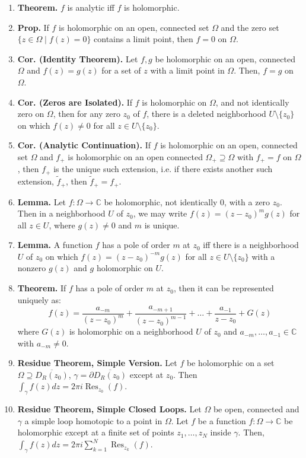 \documentclass[12pt]{article}
\theoremstyle{definition}
\theoremstyle{named}
\DeclareMathOperator{\Res}{Res}
\begin{document}
{\begin{multicols}{2}
\begin{spacing}{1.01}
\begin{enumerate}
    \item \textbf{Theorem. } $f$ is analytic iff $f$ is holomorphic. 
    \item \textbf{Prop. } If $f$ is holomorphic on an open, connected set $\Omega$ and the zero set $\{z \in \Omega \mid f(z) = 0\}$ contains a limit point, then $f=0$ on $\Omega$. 
    \item \textbf{Cor. (Identity Theorem). } Let $f,g$ be holomorphic on an open, connected $\Omega$ and $f(z)=g(z)$ for a set of $z$ with a limit point in $\Omega$. Then, $f=g$ on $\Omega$. 
    \item \textbf{Cor. (Zeros are Isolated). } If $f$ is holomorphic on $\Omega$, and not identically zero on $\Omega$, then for any zero $z_0$ of $f$, there is a deleted neighborhood $U \setminus \{z_0\}$ on which $f(z) \neq 0$ for all $z \in U \setminus \{z_0\}$. 
    \item \textbf{Cor. (Analytic Continuation). } If $f$ is holomorphic on an open, connected set $\Omega$ and $f_+$ is holomorphic on an open connected $\Omega_+ \supseteq \Omega$ with $f_+ = f$ on $\Omega$, then $f_+$ is the unique such extension, i.e. if there exists another such extension, $\tilde{f}_+$, then $\tilde{f}_+ = f_+$. 
    \item \textbf{Lemma. } Let $f: \Omega \to \mathbb{C}$ be holomorphic, not identically 0, with a zero $z_0$. Then in a neighborhood $U$ of $z_0$, we may write $f(z) = (z-z_0)^mg(z)$ for all $z \in U$, where $g(z) \neq 0$ and $m$ is unique. 
    \item \textbf{Lemma. } A function $f$ has a pole of order $m$ at $z_0$ iff there is a neighborhood $U$ of $z_0$ on which $f(z) = (z-z_0)^{-m}g(z)$ for all $z \in U \setminus \{z_0\}$ with a nonzero $g(z)$ and $g$ holomorphic on $U$. 
    \item \textbf{Theorem. } If $f$ has a pole of order $m$ at $z_0$, then it can be represented uniquely as: 
    $$
    f(z) = \frac{a_{-m}}{(z-z_0)^m} + \frac{a_{-m+1}}{(z-z_0)^{m-1}} + \dots + \frac{a_{-1}}{z-z_0} + G(z)
    $$ where $G(z)$ is holomorphic on a neighborhood $U$ of $z_0$ and $a_{-m}, \dots, a_{-1} \in \mathbb{C}$ with $a_{-m} \neq 0$. 
    \item \textbf{Residue Theorem, Simple Version. } Let $f$ be holomorphic on a set $\Omega \supseteq \overline{D_R(z_0)}$, $\gamma = \partial \overline{D_R(z_0)}$ except at $z_0$. Then $\int_\gamma f(z) dz = 2\pi i \Res_{z_0}(f)$. 
    \item \textbf{Residue Theorem, Simple Closed Loops. } Let $\Omega$ be open, connected and $\gamma$ a simple loop homotopic to a point in $\Omega$. Let $f$ be a function $f: \Omega \to \mathbb{C}$ be holomorphic except at a finite set of points $z_1, \dots, z_N$ inside $\gamma$. Then, $\int_\gamma f(z) dz = 2\pi i \sum_{k=1}^{N}\Res_{z_k}(f)$. 

\end{enumerate}
\end{spacing}
\end{multicols}}
\end{document}
